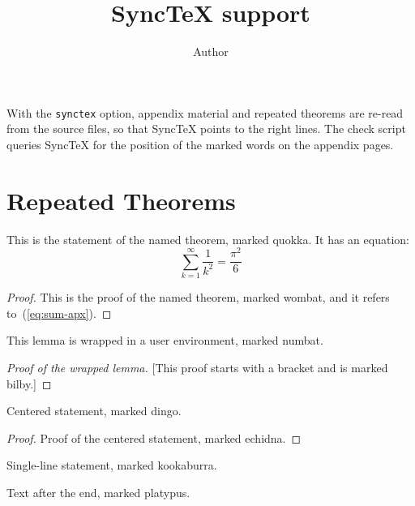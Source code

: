 \documentclass{article}
\date{}
\title{SyncTeX support}
\author{Author}
\newenvironment{mylemma}[1][]{\begin{lemmarep}[#1]}{\end{lemmarep}}
\begin{document}
\maketitle

With the \texttt{synctex} option, appendix material and repeated
theorems are re-read from the source files, so that SyncTeX points to
the right lines. The check script queries SyncTeX for the position of
the marked words on the appendix pages.

\section{Repeated Theorems}

\begin{theoremrep}[Named]
  \label{th:named}%
  This is the statement of the named theorem, marked quokka.
  It has an equation:
  \begin{equation}
    \label{eq:sum}
    \sum_{k=1}^\infty \frac1{k^2}=\frac{\pi^2}6
  \end{equation}
\end{theoremrep}

\begin{proof}
  This is the proof of the named theorem, marked wombat, and it refers
  to~(\ref{eq:sum-apx}).
\end{proof}

\begin{mylemma}[Wrapped]
  This lemma is wrapped in a user environment, marked numbat.
\end{mylemma}

\begin{proof}[Proof of the wrapped lemma]
  [This proof starts with a bracket and is marked bilby.]
\end{proof}

\begin{center}\begin{theoremrep}
  Centered statement, marked dingo.
\end{theoremrep}\end{center}

\begin{proof}
  Proof of the centered statement, marked echidna.
\end{proof}

\begin{theoremrep} Single-line statement, marked kookaburra. \end{theoremrep} Text after the end, marked platypus.
\end{document}
